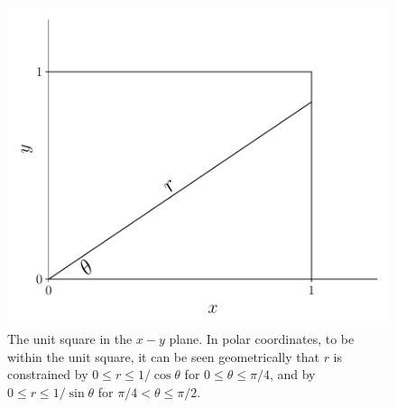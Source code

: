 \begin{problem}{30}
	\begin{figure}[t]
	\centering
      		 \includegraphics[totalheight=6cm]{chpt5/prob30c.pdf}
  			  \caption{The unit square in the $x-y$ plane.  In polar coordinates, to be within the unit square, it can be seen geometrically that $r$ is constrained by $0\le r \le 1/ \cos \theta$ for $0 \le \theta \le \pi/4$, and by $0\le r \le 1/ \sin \theta$ for $\pi/4< \theta \le \pi/2$.}
    			   \label{fig:prob_30c}
	\end{figure}

\end{problem}

